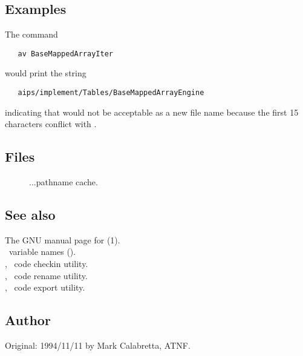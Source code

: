 \subsection*{Examples}

The command

\begin{verbatim}
   av BaseMappedArrayIter
\end{verbatim}

\noindent
would print the string

\begin{verbatim}
   aips/implement/Tables/BaseMappedArrayEngine
\end{verbatim}

\noindent
indicating that  would not be acceptable as a new
file name because the first 15 characters conflict with
.

\subsection*{Files}

\begin{description}
\item[]
...pathname cache.
\end{description}

\subsection*{See also}

The GNU manual page for (1).\\
\aipspp\ variable names ().\\
, \aipspp\ code checkin utility.\\
, \aipspp\ code rename utility.\\
, \aipspp\ code export utility.

\subsection*{Author}

Original: 1994/11/11 by Mark Calabretta, ATNF.


\newpage
\section{}
\label{avers}

